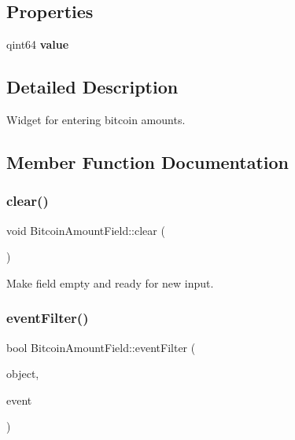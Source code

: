 \subsection*{Properties}
\begin{DoxyCompactItemize}
\item 
\mbox{\label{class_bitcoin_amount_field_ad9934f4b11cc805cb489801b28121e44}} 
qint64 {\bfseries value}
\end{DoxyCompactItemize}


\subsection{Detailed Description}
Widget for entering bitcoin amounts. 

\subsection{Member Function Documentation}
\mbox{\label{class_bitcoin_amount_field_a66fb8e84968302c0a1b1914338ff8001}} 
\subsubsection{\texorpdfstring{clear()}{clear()}}
{\footnotesize\ttfamily void Bitcoin\+Amount\+Field\+::clear (\begin{DoxyParamCaption}{ }\end{DoxyParamCaption})}

Make field empty and ready for new input. \mbox{\label{class_bitcoin_amount_field_acc04caa1dfdc0c007ec978fb05ac9061}} 
\subsubsection{\texorpdfstring{event\+Filter()}{eventFilter()}}
{\footnotesize\ttfamily bool Bitcoin\+Amount\+Field\+::event\+Filter (\begin{DoxyParamCaption}\item[{Q\+Object $\ast$}]{object,  }\item[{Q\+Event $\ast$}]{event }\end{DoxyParamCaption})\hspace{0.3cm}{\ttfamily [protected]}}


